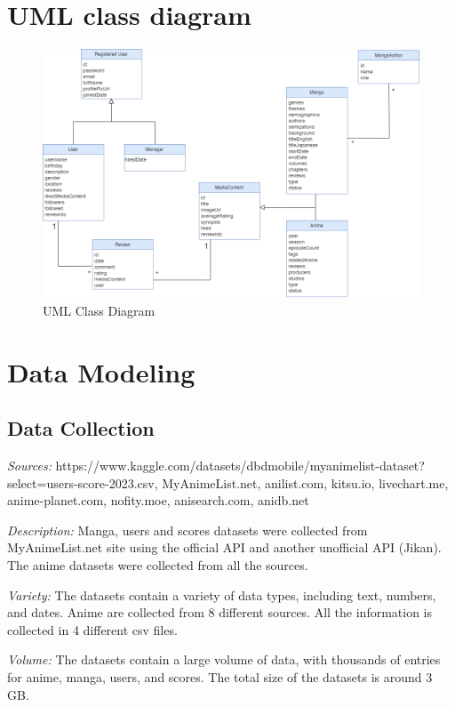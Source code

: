\newpage

\section{UML class diagram}
\begin{figure}[h]
    \centering
    \includegraphics[width=\linewidth]{Media/Class_Diagram.png}
    \caption{UML Class Diagram}
    \label{uml class diagram}
\end{figure}

\newpage


\section{Data Modeling}
\subsection{Data Collection}
\textit{Sources:} https://www.kaggle.com/datasets/dbdmobile/myanimelist-dataset?select=users-score-2023.csv, MyAnimeList.net,	anilist.com,  kitsu.io,			  livechart.me,
anime-planet.com,		nofity.moe,	   anisearch.com,		  anidb.net 	

\textit{Description:} Manga, users and scores datasets were collected from MyAnimeList.net site using the official API and another unofficial API (Jikan). The anime datasets were collected from all the sources. 

\textit{Variety:} The datasets contain a variety of data types, including text, numbers, and dates. Anime are collected from 8 different sources. All the information is collected in 4 different csv files.

\textit{Volume:} The datasets contain a large volume of data, with thousands of entries for anime, manga, users, and scores. The total size of the datasets is around 3 GB.

